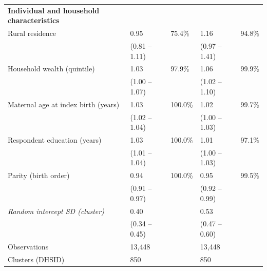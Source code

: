 \begin{table}[H]
\begin{threeparttable}
{\begin{tabular}{l ll ll}
\textbf{Individual and household characteristics} & & & & \\
\hspace{2pt} Rural residence & 0.95 & 75.4\% & 1.16 & 94.8\% \\
 & (0.81 -- 1.11) & & (0.97 -- 1.41) & \\
\hspace{2pt} Household wealth (quintile) & 1.03 & 97.9\% & 1.06 & 99.9\% \\
 & (1.00 -- 1.07) & & (1.02 -- 1.10) & \\
\hspace{2pt} Maternal age at index birth (years) & 1.03 & 100.0\% & 1.02 & 99.7\% \\
 & (1.02 -- 1.04) & & (1.00 -- 1.03) & \\
\hspace{2pt} Respondent education (years) & 1.03 & 100.0\% & 1.01 & 97.1\% \\
 & (1.01 -- 1.04) & & (1.00 -- 1.03) & \\
\hspace{2pt} Parity (birth order) & 0.94 & 100.0\% & 0.95 & 99.5\% \\
 & (0.91 -- 0.97) & & (0.92 -- 0.99) & \\

\hline
\textit{Random intercept SD (cluster)} & 0.40 & & 0.53 & \\
 & (0.34 -- 0.45) & & (0.47 -- 0.60) & \\
Observations & 13,448 & & 13,448 & \\
Clusters (DHSID) & 850 & & 850 & \\
\hline



\end{tabular}}
\end{threeparttable}
\end{table}
